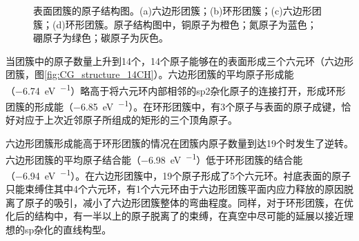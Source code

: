 \begin{figure}[htb]
{        }
        \caption{表面团簇的原子结构图。(a)六边形团簇；(b)环形团簇；(c)六边形团簇；(d)环形团簇。原子结构图中，铜原子为橙色；氮原子为蓝色；硼原子为绿色；碳原子为灰色。}
        \label{fig:CG_CG_structure_14-19C}
    \end{figure}
    
    当团簇中的原子数量上升到14个，14个原子能够在的表面形成三个六元环（六边形团簇，图\ref{fig:CG_structure_14CH}）。六边形团簇的平均原子形成能（\SI{-6.74}{\electronvolt\per\atom}）略高于将六元环内部相邻的sp2杂化原子的连接打开，形成环形团簇的形成能（\SI{-6.85}{\electronvolt\per\atom}）。在环形团簇中，有3个原子与表面的原子成键，恰好对应于上次近邻原子所组成的矩形的三个顶角原子。

    六边形团簇形成能高于环形团簇的情况在团簇内原子数量到达19个时发生了逆转。六边形团簇的平均原子结合能（\SI{-6.98}{\electronvolt\per\atom}）低于环形团簇的结合能（\SI{-6.94}{\electronvolt\per\atom}）。在六边形团簇中，19个原子形成了5个六元环。衬底表面的原子只能束缚住其中4个六元环，有1个六元环由于六边形团簇平面内应力释放的原因脱离了原子的吸引，减小了六边形团簇整体的弯曲程度。同样，对于环形团簇，在优化后的结构中，有一半以上的原子脱离了的束缚，在真空中尽可能的延展以接近理想的sp杂化的直线构型。

